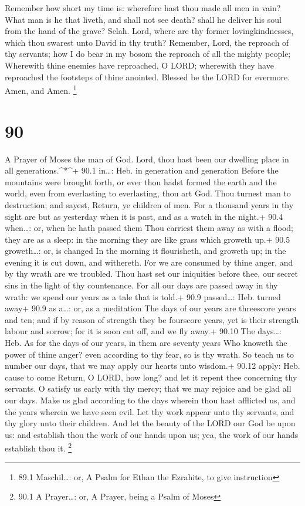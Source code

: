 Remember how short my time is: wherefore hast thou made all men in vain?
 What man is he that liveth, and shall not see death? shall
he deliver his soul from the hand of the grave? Selah. 
Lord, where are thy former lovingkindnesses, which thou swarest unto
David in thy truth?  Remember, Lord, the reproach of thy
servants; how I do bear in my bosom the reproach of all the mighty
people;  Wherewith thine enemies have reproached, O LORD;
wherewith they have reproached the footsteps of thine anointed.
 Blessed be the LORD for evermore. Amen, and Amen.
\footnote{89.1 Maschil\ldots: or, A Psalm for Ethan the Ezrahite, to
  give instruction}

\hypertarget{section-89}{%
\section{90}\label{section-89}}

A Prayer of Moses the man of God.  Lord, thou hast been our
dwelling place in all generations.\^{}*\^{}+ 90.1 in\ldots: Heb. in
generation and generation  Before the mountains were brought
forth, or ever thou hadst formed the earth and the world, even from
everlasting to everlasting, thou art God.  Thou turnest man
to destruction; and sayest, Return, ye children of men.  For
a thousand years in thy sight are but as yesterday when it is past, and
as a watch in the night.+ 90.4 when\ldots: or, when he hath passed them
 Thou carriest them away as with a flood; they are as a
sleep: in the morning they are like grass which groweth up.+ 90.5
groweth\ldots: or, is changed  In the morning it
flourisheth, and groweth up; in the evening it is cut down, and
withereth.  For we are consumed by thine anger, and by thy
wrath are we troubled.  Thou hast set our iniquities before
thee, our secret sins in the light of thy countenance.  For
all our days are passed away in thy wrath: we spend our years as a tale
that is told.+ 90.9 passed\ldots: Heb. turned away+ 90.9 as a\ldots: or,
as a meditation  The days of our years are threescore years
and ten; and if by reason of strength they be fourscore years, yet is
their strength labour and sorrow; for it is soon cut off, and we fly
away.+ 90.10 The days\ldots: Heb. As for the days of our years, in them
are seventy years  Who knoweth the power of thine anger?
even according to thy fear, so is thy wrath.  So teach us
to number our days, that we may apply our hearts unto wisdom.+ 90.12
apply: Heb. cause to come  Return, O LORD, how long? and
let it repent thee concerning thy servants.  O satisfy us
early with thy mercy; that we may rejoice and be glad all our days.
 Make us glad according to the days wherein thou hast
afflicted us, and the years wherein we have seen evil.  Let
thy work appear unto thy servants, and thy glory unto their children.
 And let the beauty of the LORD our God be upon us: and
establish thou the work of our hands upon us; yea, the work of our hands
establish thou it. \footnote{90.1 A Prayer\ldots: or, A Prayer, being a
  Psalm of Moses}

